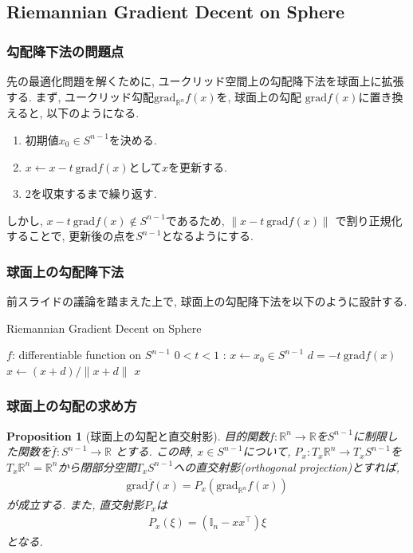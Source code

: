 \documentclass[dvipdfmx,11pt]{beamer}		%
\newtheorem{prop}[defi]{Proposition}
\newcommand{\R}{\mathbb{R}}
\begin{document}
    \subsection{Riemannian Gradient Decent on Sphere}
    \begin{frame}
        \frametitle{勾配降下法の問題点}
        先の最適化問題を解くために, ユークリッド空間上の勾配降下法を球面上に拡張する. 
        まず, ユークリッド勾配$\mathrm{grad}_{\R^n}f(x)$を, 球面上の勾配
        $\mathrm{grad}f(x)$に置き換えると, 以下のようになる. 
        \begin{enumerate}
            \item 初期値$x_{0}\in S^{n - 1}$を決める.
            \item $x\leftarrow x - t~\mathrm{grad} f(x)$として$x$を更新する.
            \item 2を収束するまで繰り返す. 
        \end{enumerate}
        しかし, $x - t~\mathrm{grad} f(x)\notin S^{n - 1}$であるため, $\|x - t~\mathrm{grad} f(x)\|$
        で割り正規化することで, 更新後の点を$S^{n - 1}$となるようにする. 
    \end{frame}
    \begin{frame}
        \frametitle{球面上の勾配降下法}
        前スライドの議論を踏まえた上で, 球面上の勾配降下法を以下のように設計する. 
        \begin{algorithm}[H]
            \caption{Riemannian Gradient Decent on Sphere}
            \begin{algorithmic}
                \REQUIRE $f$: differentiable function on $S^{n - 1}$
                \REQUIRE $0< t <1$ : 
                \STATE $x\leftarrow x_{0}\in S^{n - 1}$
                \STATE $d = -t~\mathrm{grad} f(x)$
                \STATE $x\leftarrow (x + d)/\|x + d\|$ 
                \ENDWHILE
                \RETURN $x$
            \end{algorithmic}
        \end{algorithm}
    \end{frame}
    \begin{frame}
        \frametitle{球面上の勾配の求め方}
        \begin{prop}[球面上の勾配と直交射影]
            目的関数$f:\R^{n}\to\R$を$S^{n - 1}$に制限した関数を$\overline{f}:S^{n - 1}\to\R$
            とする. この時, $x\in S^{n -1}$について, $P_x : T_{x}\R^{n}\to T_{x}S^{n - 1}$を
            $T_{x}\R^n = \R^n$から閉部分空間$T_{x}S^{n - 1}$への直交射影(orthogonal projection)とすれば,
            \begin{align*}
                \mathrm{grad} \overline{f}(x) = P_{x}(\mathrm{grad}_{\R^{n}}f(x))
            \end{align*}
            が成立する. また, 直交射影$P_x$は 
            \begin{align*}
                P_{x}(\xi) = (\mathbb{I}_{n} - xx^{\top})\xi
            \end{align*}
            となる. 
        \end{prop}
    \end{frame}
\end{document}

